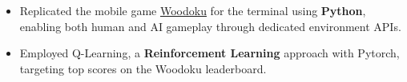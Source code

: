 \documentclass[10pt,a4paper,ragged2e,withhyper]{altacv}
\begin{document}
\begin{paracol}{2}



    \divider{}


    \begin{itemize}

        \item Replicated the mobile game \href{https://play.google.com/store/apps/details?id=com.tripledot.woodoku&hl=en_CA&gl=US}{Woodoku} for the terminal using \textbf{Python}, enabling both human and AI gameplay through dedicated environment APIs.
        \item Employed Q-Learning, a \textbf{Reinforcement Learning} approach with Pytorch, targeting top scores on the Woodoku leaderboard.

    \end{itemize}




\end{paracol}
\end{document}
